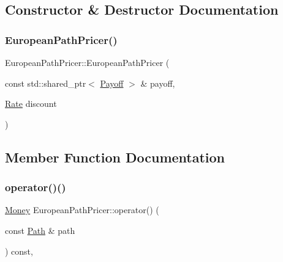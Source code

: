 \subsection{Constructor \& Destructor Documentation}
\hypertarget{class_european_path_pricer_aa571bb1652a0d7e4f97d3d58e7c8b295}{}\label{class_european_path_pricer_aa571bb1652a0d7e4f97d3d58e7c8b295} 
\subsubsection{\texorpdfstring{European\+Path\+Pricer()}{EuropeanPathPricer()}}
{\footnotesize\ttfamily European\+Path\+Pricer\+::\+European\+Path\+Pricer (\begin{DoxyParamCaption}\item[{const std\+::shared\+\_\+ptr$<$ \hyperlink{class_payoff}{Payoff} $>$ \&}]{payoff,  }\item[{\hyperlink{_name_def_8h_a25bee43a162de339c81f3d1caf6b887d}{Rate}}]{discount }\end{DoxyParamCaption})}



\subsection{Member Function Documentation}
\hypertarget{class_european_path_pricer_ac12142089ccdc7fe73ba93d66a7964e6}{}\label{class_european_path_pricer_ac12142089ccdc7fe73ba93d66a7964e6} 
\subsubsection{\texorpdfstring{operator()()}{operator()()}}
{\footnotesize\ttfamily \hyperlink{_name_def_8h_a5a9d48c16a694e9a2d9f1eca730dc8c5}{Money} European\+Path\+Pricer\+::operator() (\begin{DoxyParamCaption}\item[{const \hyperlink{class_path}{Path} \&}]{path }\end{DoxyParamCaption}) const\hspace{0.3cm}{\ttfamily [override]}, {\ttfamily [virtual]}}



